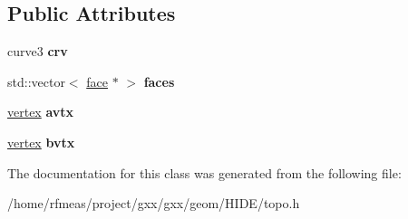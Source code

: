 \subsection*{Public Attributes}
\begin{DoxyCompactItemize}
\item 
curve3 {\bfseries crv}\hypertarget{classgxx_1_1topo_1_1edge__impl_a3139cd8b8c51a4059f6b3899820e4ff0}{}\label{classgxx_1_1topo_1_1edge__impl_a3139cd8b8c51a4059f6b3899820e4ff0}

\item 
std\+::vector$<$ \hyperlink{classgxx_1_1topo_1_1face}{face} $\ast$ $>$ {\bfseries faces}\hypertarget{classgxx_1_1topo_1_1edge__impl_acf964295b6c575f836c8296143c56813}{}\label{classgxx_1_1topo_1_1edge__impl_acf964295b6c575f836c8296143c56813}

\item 
\hyperlink{classgxx_1_1topo_1_1vertex}{vertex} {\bfseries avtx}\hypertarget{classgxx_1_1topo_1_1edge__impl_ac7baadb7e2a14d451c45a38f78180be0}{}\label{classgxx_1_1topo_1_1edge__impl_ac7baadb7e2a14d451c45a38f78180be0}

\item 
\hyperlink{classgxx_1_1topo_1_1vertex}{vertex} {\bfseries bvtx}\hypertarget{classgxx_1_1topo_1_1edge__impl_aa3ad18feb795dc9574dd494271c74df1}{}\label{classgxx_1_1topo_1_1edge__impl_aa3ad18feb795dc9574dd494271c74df1}

\end{DoxyCompactItemize}


The documentation for this class was generated from the following file\+:\begin{DoxyCompactItemize}
\item 
/home/rfmeas/project/gxx/gxx/geom/\+H\+I\+D\+E/topo.\+h\end{DoxyCompactItemize}
